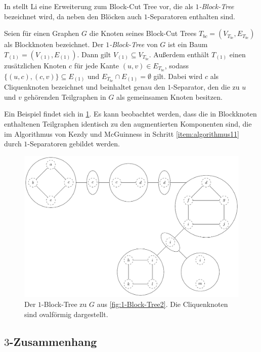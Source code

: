 In \cite{Li11} stellt Li eine Erweiterung zum Block-Cut Tree vor, die als \emph{$1$-Block-Tree} bezeichnet wird, da neben den Blöcken auch $1$-Separatoren enthalten sind.

\begin{definition}
  Seien für einen Graphen $G$ die Knoten seines Block-Cut Trees $T_{bc} = (V_{T_{bc}}, E_{T_{bc}})$ als Blockknoten bezeichnet.
  Der \emph{$1$-Block-Tree} von $G$ ist ein Baum $T_{(1)} = (V_{(1)}, E_{(1)})$.
  Dann gilt $V_{(1)} \subseteq V_{T_{bc}}$.
  Außerdem enthält $T_{(1)}$ einen zusätzlichen Knoten $c$ für jede Kante $(u, v) \in E_{T_{bc}}$, sodass $\{(u, c), (c, v)\} \subseteq E_{(1)}$ und $E_{T_{bc}} \cap E_{(1)} = \emptyset$ gilt.
  Dabei wird $c$ als Cliquenknoten bezeichnet und beinhaltet genau den $1$-Separator, den die zu $u$ und $v$ gehörenden Teilgraphen in $G$ als gemeinsamen Knoten besitzen.
\end{definition}

Ein Beispiel findet sich in \Abb \ref{fig:1-Block-Tree3}.
Es kann beobachtet werden, dass die in Blockknoten enthaltenen Teilgraphen identisch zu den augmentierten Komponenten sind, die im Algorithmus von Kezdy und McGuinness in Schritt \ref{item:algorithmus11} durch $1$-Separatoren gebildet werden.
\begin{figure}[H]
  \centering
  \includegraphics[width=\textwidth,height=\textheight,keepaspectratio]{bilder/1-Block-Tree3.pdf}
  \caption{Der $1$-Block-Tree zu $G$ aus \Abb \ref{fig:1-Block-Tree2}.
           Die Cliquenknoten sind ovalförmig dargestellt.}
  \label{fig:1-Block-Tree3}
\end{figure}


\subsection{$3$-Zusammenhang}

